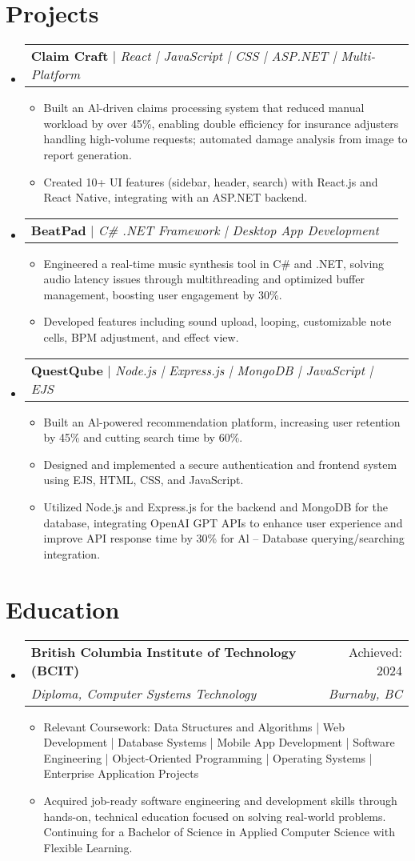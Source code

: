 \documentclass[letterpaper,11pt]{article}
\makeatletter
\newcommand{\resumeItem}[1]{
\item\small{
{#1 \vspace{-2pt}}
}
}
\newcommand{\resumeSubheading}[4]{
\vspace{-2pt}\item
\begin{tabular*}{0.97\textwidth}[t]{l@{\extracolsep{\fill}}r}
\textbf{#1} & #2 \\
\textit{\small#3} & \textit{\small #4} \\
\end{tabular*}\vspace{-7pt}
}
\newcommand{\resumeProjectHeading}[2]{
\item
\begin{tabular*}{0.97\textwidth}{l@{\extracolsep{\fill}}r}
\small#1 & #2 \\
\end{tabular*}\vspace{-7pt}
}
\newcommand{\resumeSubHeadingListStart}{\begin{itemize}[leftmargin=0.15in, label={}]}
\newcommand{\resumeSubHeadingListEnd}{\end{itemize}}
\newcommand{\resumeItemListStart}{\begin{itemize}}
\newcommand{\resumeItemListEnd}{\end{itemize}\vspace{-5pt}}
\makeatother
\begin{document}
\section{Projects}
\resumeSubHeadingListStart
\resumeProjectHeading{\textbf{Claim Craft} $|$ \emph{React | JavaScript | CSS | ASP.NET | Multi-Platform}}{}
\resumeItemListStart
\resumeItem{Built an Al-driven claims processing system that reduced manual workload by over 45\%, enabling double efficiency for insurance adjusters handling high-volume requests; automated damage analysis from image to report generation.}
\resumeItem{Created 10+ UI features (sidebar, header, search) with React.js and React Native, integrating with an ASP.NET backend.}
\resumeItemListEnd

\resumeProjectHeading{\textbf{BeatPad} $|$ \emph{C\# .NET Framework | Desktop App Development}}{}
\resumeItemListStart
\resumeItem{Engineered a real-time music synthesis tool in C\# and .NET, solving audio latency issues through multithreading and optimized buffer management, boosting user engagement by 30\%.}
\resumeItem{Developed features including sound upload, looping, customizable note cells, BPM adjustment, and effect view.}
\resumeItemListEnd

\resumeProjectHeading{\textbf{QuestQube} $|$ \emph{Node.js | Express.js | MongoDB | JavaScript | EJS}}{}
\resumeItemListStart
\resumeItem{Built an Al-powered recommendation platform, increasing user retention by 45\% and cutting search time by 60\%.}
\resumeItem{Designed and implemented a secure authentication and frontend system using EJS, HTML, CSS, and JavaScript.}
\resumeItem{Utilized Node.js and Express.js for the backend and MongoDB for the database, integrating OpenAI GPT APIs to enhance user experience and improve API response time by 30\% for Al – Database querying/searching integration.}
\resumeItemListEnd
\resumeSubHeadingListEnd

\section{Education}
\resumeSubHeadingListStart
\resumeSubheading{British Columbia Institute of Technology (BCIT)}{Achieved: 2024}{Diploma, Computer Systems Technology}{Burnaby, BC}
\resumeItemListStart
\resumeItem{Relevant Coursework: Data Structures and Algorithms | Web Development | Database Systems | Mobile App Development | Software Engineering | Object-Oriented Programming | Operating Systems | Enterprise Application Projects}
\resumeItem{Acquired job-ready software engineering and development skills through hands-on, technical education focused on solving real-world problems. Continuing for a Bachelor of Science in Applied Computer Science with Flexible Learning.}
\resumeItemListEnd
\resumeSubHeadingListEnd
\end{document}
